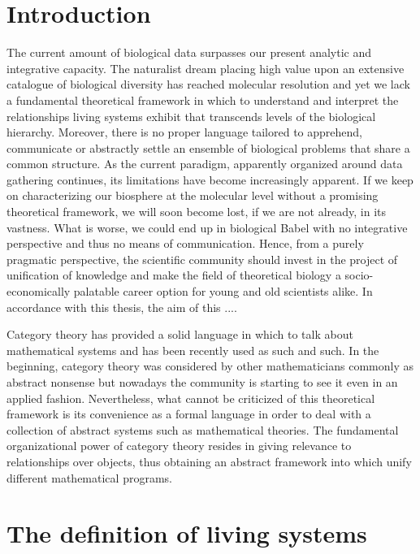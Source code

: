 \documentclass[aps,twocolumn]{revtex4-1}
\begin{document}
\tableofcontents

\section{Introduction}

The current amount of biological data surpasses our present analytic and integrative capacity. The naturalist dream placing high value upon an extensive catalogue of biological diversity has reached molecular resolution and yet we lack a fundamental theoretical framework in which to understand and interpret the relationships living systems exhibit that transcends levels of the biological hierarchy. Moreover, there is no proper language tailored to apprehend, communicate or abstractly settle an ensemble of biological problems that share a common structure. As the current paradigm, apparently organized around data gathering continues, its limitations have become increasingly apparent. If we keep on characterizing our biosphere at the molecular level without a promising theoretical framework, we will soon become lost, if we are not already, in its vastness. What is worse, we could end up in biological Babel with no integrative perspective and thus no means of communication. Hence, from a purely pragmatic perspective, the scientific community should invest in the project of unification of knowledge and make the field of theoretical biology a socio-economically palatable career option for young and old scientists alike. In accordance with this thesis, the aim of this ....

Category theory has provided  a solid language in which to talk about mathematical systems and has been recently  used as such and such. In the beginning, category theory was considered by other mathematicians commonly as abstract nonsense but nowadays the community is starting to see it even in an applied fashion. Nevertheless, what cannot be criticized of this theoretical framework is its convenience as a formal language in order to deal with a collection of abstract systems such as mathematical theories. The fundamental organizational power of category theory resides in giving relevance to relationships over objects, thus obtaining an abstract framework into which unify different mathematical programs.

\section{The definition of living systems}
\end{document}
